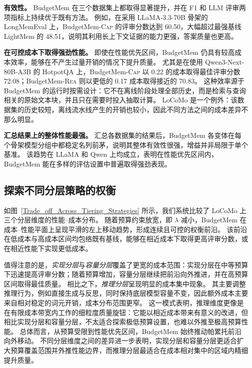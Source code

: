 \textbf{有效性。}
BudgetMem 在三个数据集上都取得显著提升，并在 F1 和 LLM 评审两项指标上持续优于既有方法。
例如，在采用 LLaMA-3.3-70B 骨架的 LongMemEval 上，BudgetMem-\textsc{Cap} 的评审分数达到 60.50，大幅超过最强基线 LightMem 的 48.51，说明其利用长上下文证据的能力更强，答案质量也更高。

\textbf{在可控成本下取得强劲性能。}
即使在性能优先区间，BudgetMem 仍具有较高成本效率，能够在不产生过量开销的情况下提升质量。
尤其是在使用 Qwen3-Next-80B-A3B 的 HotpotQA 上，BudgetMem-\textsc{Cap} 以 0.22 的成本取得最佳评审分数 72.08；BudgetMem-\textsc{Rea} 则以更低的 0.17 成本取得接近的 70.83。
这种效率源于 BudgetMem 的运行时按需设计：它不在离线阶段处理全部历史，而是检索与查询相关的原始文本块，并且只在需要时投入抽取计算。
LoCoMo 是一个例外：该数据集的历史较短，离线流水线产生的开销也较小，因此不同方法之间的成本差异不那么明显。

\textbf{汇总结果上的整体性能最强。}
汇总各数据集的结果后，BudgetMem 各变体在每个骨架模型分组中都稳定名列前茅，说明其整体有效性很强，增益并非局限于单个基准。
该趋势在 LLaMA 和 Qwen 上均成立，表明在性能优先区间内，BudgetMem 能在多样的评估设置中普遍取得强劲表现。

\subsection{探索不同分层策略的权衡}
\label{sec:trade-off}

如图~\ref{Trade_off_Across_Tiering_Strategies} 所示，我们系统比较了 LoCoMo 上三个分层维度的性能--成本分布。
随着预算约束放宽，即 $\lambda$ 减小，BudgetMem 在成本--性能平面上呈现平滑的左上移动趋势，形成连续且可控的权衡前沿。
该前沿在低成本与高成本区间均包络既有基线，能够在相近成本下取得更高评审分数，或在相近性能下实现更低成本。

值得注意的是，\emph{实现分层}与\emph{容量分层}覆盖了更宽的成本范围：实现分层在中等预算下迅速提高评审分数；随着预算增加，容量分层继续把前沿向外推进，并在高预算区间取得最佳质量。
相比之下，\emph{推理分层}呈现明显的成本集中现象。
其主要调整推理行为，例如直接生成与反思，同时保持底层模型容量不变，因此额外成本主要来自相对稳定的词元开销，成本分布范围更窄。
这一模式表明，推理维度更像是在有限成本带宽内工作的细粒度质量旋钮：它能以相近成本带来有意义的改进，但相比实现分层和容量分层，不太适合探索极低预算设置，也难以外推至极高预算性能。
总体而言，从预算受限到性能优先区间，BudgetMem 始终推动帕累托前沿向外移动。
不同分层维度之间的差异进一步表明，实现分层和容量分层更适合扩大预算覆盖范围并外推性能边界，而推理分层最适合在成本相对集中的区域内精细提升质量。

